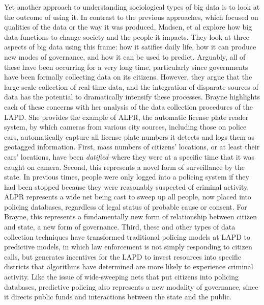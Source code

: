 \documentclass[sigconf]{acmart}
\begin{document}
Yet another approach to understanding sociological types of big data is to look at the outcome of using it.  In contrast to the previous approaches, which focused on qualities of the data or the way it was produced, Madsen, et al \cite{madsen16} explore how big data functions to change society and the people it impacts.  They look at three aspects of big data using this frame: how it satifies daily life, how it can produce new modes of governance, and how it can be used to predict.  Arguably, all of these have been occurring for a very long time, particularly since governments have been formally collecting data on its citizens.  However, they argue that the large-scale collection of real-time data, and the integration of disparate sources of data has the potential to dramatically intensify these processes.  Brayne \cite {brayne17} highlights each of these concerns with her analysis of the data collection procedures of the LAPD.  She provides the example of ALPR, the automatic license plate reader system, by which cameras from various city sources, including those on police cars, automatically capture all license plate numbers it detects and logs them as geotagged information.   First, mass numbers of citizens' locations, or at least their cars' locations, have been {\em datified}--where they were at a specific time that it was caught on camera.  Second, this represents a novel form of surveillance by the state.  In previous times, people were only logged into a policing system if they had been stopped because they were reasonably suspected of criminal activity.  ALPR represents a wide net being cast to sweep up all people, now placed into policing databases, regardless of legal status of probable cause or consent.  For Brayne, this represents a fundamentally new form of relationship between citizen and state, a new form of governance.  Third, these and other types of data collection techniques have transformed traditional policing models at LAPD to predictive models, in which law enforcement is not simply responding to citizen calls, but generates incentives for the LAPD to invest resources into specific districts that algorithms have determined are more likely to experience criminal activity.  Like the issue of wide-sweeping nets that put citizens into policing databases, predictive policing also represents a new modality of governance, since it directs public funds and interactions between the state and the public.
\end{document}
